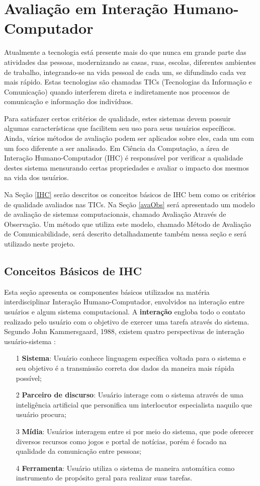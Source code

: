 \chapter{Avaliação em Interação Humano-Computador}

\indent Atualmente a tecnologia está presente mais do que nunca em grande parte das atividades das pessoas, modernizando as casas, ruas, escolas, diferentes ambientes de trabalho, integrando-se na vida pessoal de cada um, se difundindo cada vez mais rápido. Estas tecnologias são chamadas TICs (Tecnologias da Informação e Comunicação) quando interferem direta e indiretamente nos processos de comunicação e informação dos indivíduos. 

\indent Para satisfazer certos critérios de qualidade, estes sistemas devem possuir algumas características que facilitem seu uso para seus usuários específicos. Ainda, vários métodos de avaliação podem ser aplicados sobre eles, cada um com um foco diferente a ser analisado. Em Ciência da Computação, a área de Interação Humano-Computador (IHC) é responsável por verificar a qualidade destes sistema mensurando certas propriedades e avaliar o impacto dos mesmos na vida dos usuários. 

\indent Na Seção \ref{IHC} serão descritos os conceitos básicos de IHC bem como os critérios de qualidade avaliados nas TICs. Na Seção \ref{avaObs} será apresentado um modelo de avaliação de sistemas computacionais, chamado Avaliação Através de Observação. Um método que utiliza este modelo, chamado Método de Avaliação de Comunicabilidade, será descrito detalhadamente também nessa seção e será utilizado neste projeto.
 
\section{Conceitos Básicos de IHC} \label{cbIHC}

\indent Esta seção apresenta os componentes básicos utilizados na matéria interdisciplinar Interação Humano-Computador, envolvidos na interação entre usuários e algum sistema computacional. A \textbf{interação} engloba todo o contato realizado pelo usuário com o objetivo de exercer uma tarefa através do sistema. Segundo John Kammersgaard, 1988, existem quatro perspectivas de interação usuário-sistema \cite{IHCbook}:
\begin{itemize}
\item[1] \textbf{Sistema}: Usuário conhece linguagem específica voltada para o sistema e seu objetivo é a transmissão correta dos dados da maneira mais rápida possível;
\item[2] \textbf{Parceiro de discurso}: Usuário interage com o sistema através de uma inteligência artificial que personifica um interlocutor especialista naquilo que usuário procura;
\item[3] \textbf{Mídia}: Usuários interagem entre si por meio do sistema, que pode oferecer diversos recursos como jogos e portal de notícias, porém é focado na qualidade da comunicação entre pessoas;
\item[4] \textbf{Ferramenta}: Usuário utiliza o sistema de maneira automática como instrumento de propósito geral para realizar suas tarefas. 
\end{itemize}

